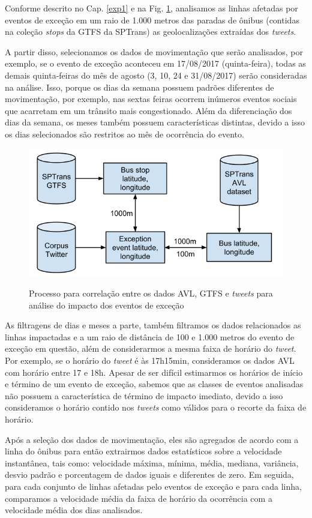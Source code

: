 \documentclass[
	12pt,				%
	oneside,			%
	a4paper,			%
	english,			%
	brazil				%
	]{abntex2ppgsi}
\begin{document}
Conforme descrito no Cap. \ref{exp1} e na Fig. \ref{fig:avl_tweets_correlation}, analisamos as linhas afetadas por eventos de exceção em um raio de 1.000 metros das paradas de ônibus (contidas na coleção \textit{stops} da GTFS da SPTrans) as geolocalizações extraídas dos \textit{tweets}. 

A partir disso, selecionamos os dados de movimentação que serão analisados, por exemplo, se o evento de exceção aconteceu em 17/08/2017 (quinta-feira), todas as demais quinta-feiras do mês de agosto (3, 10, 24 e 31/08/2017) serão consideradas na análise. Isso, porque os dias da semana possuem padrões diferentes de movimentação, por exemplo, nas sextas feiras ocorrem inúmeros eventos sociais que acarretam em um trânsito mais congestionado. Além da diferenciação dos dias da semana, os meses também possuem características distintas, devido a isso os dias selecionados são restritos ao mês de ocorrência do evento.    

\begin{figure}[!htb]
	\centering
 	  \caption{Processo para correlação entre os dados AVL, GTFS e \textit{tweets} para análise do impacto dos eventos de exceção}
		\includegraphics[width=0.7\linewidth]{images/avl_tweets_correlation.png}
	\label{fig:avl_tweets_correlation}
\end{figure}

As filtragens de dias e meses a parte, também filtramos os dados relacionados as linhas impactadas e a um raio de distância de 100 e 1.000 metros do evento de exceção em questão, além de considerarmos a mesma faixa de horário do \textit{tweet}. Por exemplo, se o horário do \textit{tweet} é às 17h15min, consideramos os dados AVL com horário entre 17 e 18h. Apesar de ser difícil estimarmos os horários de início e término de um evento de exceção, sabemos que as classes de eventos analisadas não possuem a característica de término de impacto imediato, devido a isso consideramos o horário contido nos \textit{tweets} como válidos para o recorte da faixa de horário.

Após a seleção dos dados de movimentação, eles são agregados de acordo com a linha do ônibus para então extrairmos dados estatísticos sobre a velocidade instantânea, tais como: velocidade máxima, mínima, média, mediana, variância, desvio padrão e porcentagem de dados iguais e diferentes de zero. Em seguida, para cada conjunto de linhas afetadas pelo eventos de exceção e para cada linha, comparamos a velocidade média da faixa de horário da ocorrência com a velocidade média dos dias analisados.
\end{document}
